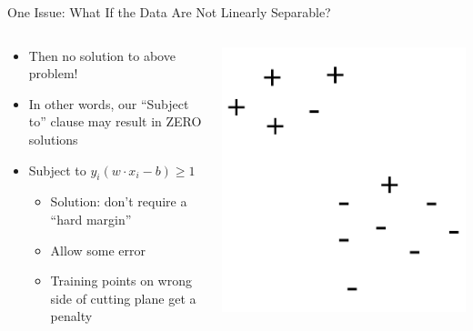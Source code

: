 \documentclass[aspectratio=169]{beamer}
\begin{document}
\begin{frame}{One Issue: What If the Data Are Not Linearly Separable?}

\begin{columns}
\begin{column}{0.6\textwidth}
\begin{itemize}
\item Then no solution to above problem!
\item In other words, our ``Subject to'' clause may result in ZERO solutions
\item Subject to $y_i (w \cdot x_i - b) \geq 1$
	\begin{itemize}
	\item Solution: don't require a ``hard margin''
	\item Allow some error
	\item Training points on wrong side of cutting plane get a penalty
	\end{itemize}
\end{itemize}
\end{column}
\begin{column}{0.4\textwidth}
\includegraphics[width=1\textwidth]{lectSVM/nonLinSep.pdf}
\end{column}
\end{columns}

\end{frame}
\end{document}
